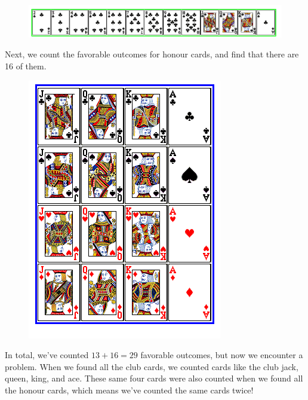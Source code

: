 \qquad
{}

\begin{figure}[H]
	\centering
	\includegraphics[scale=0.45]{kort1}
\end{figure}

Next, we count the favorable outcomes for honour cards, and find that there are 16 of them.

\begin{figure}[H]
	\centering
	\includegraphics[scale=0.45]{kort2}
\end{figure}

In total, we've counted ${13+16=29}$ favorable outcomes, but now we encounter a problem. When we found all the club cards, we counted cards like the club jack, queen, king, and ace. These same four cards were also counted when we found all the honour cards, which means we've counted the same cards twice!

